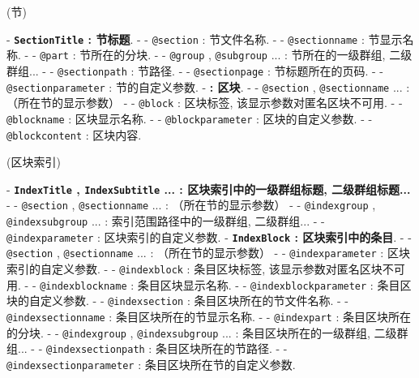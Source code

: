(\large 节){
    \par\medskip{}
    - \textbf{\texttt{SectionTitle} : 节标题}.
        - - \texttt{@section} : 节文件名称.
        - - \texttt{@sectionname} : 节显示名称.
        - - \texttt{@part} : 节所在的分块.
        - - \texttt{@group} , \texttt{@subgroup} ... : 节所在的一级群组, 二级群组...
        - - \texttt{@sectionpath} : 节路径.
        - - \texttt{@sectionpage} : 节标题所在的页码.
        - - \texttt{@sectionparameter} : 节的自定义参数.
    - \textbf{ : 区块}.
        - - \texttt{@section} , \texttt{@sectionname} ... : （所在节的显示参数）
        - - \texttt{@block} : 区块标签, 该显示参数对匿名区块不可用.
        - - \texttt{@blockname} : 区块显示名称.
        - - \texttt{@blockparameter} : 区块的自定义参数.
        - - \texttt{@blockcontent} : 区块内容.
}

\newpage

(\large 区块索引){
    \par\medskip{}
    - \textbf{\texttt{IndexTitle} , \texttt{IndexSubtitle} ... : 区块索引中的一级群组标题, 二级群组标题...}
        - - \texttt{@section} , \texttt{@sectionname} ... : （所在节的显示参数）
        - - \texttt{@indexgroup} , \texttt{@indexsubgroup} ... : 索引范围路径中的一级群组, 二级群组...
        - - \texttt{@indexparameter} : 区块索引的自定义参数.
    - \textbf{\texttt{IndexBlock} : 区块索引中的条目}.
        - - \texttt{@section} , \texttt{@sectionname} ... : （所在节的显示参数）
        - - \texttt{@indexparameter} : 区块索引的自定义参数.
        - - \texttt{@indexblock} : 条目区块标签, 该显示参数对匿名区块不可用.
        - - \texttt{@indexblockname} : 条目区块显示名称.
        - - \texttt{@indexblockparameter} : 条目区块的自定义参数.
        - - \texttt{@indexsection} : 条目区块所在的节文件名称.
        - - \texttt{@indexsectionname} : 条目区块所在的节显示名称.
        - - \texttt{@indexpart} : 条目区块所在的分块.
        - - \texttt{@indexgroup} , \texttt{@indexsubgroup} ... : 条目区块所在的一级群组, 二级群组...
        - - \texttt{@indexsectionpath} : 条目区块所在的节路径.
        - - \texttt{@indexsectionparameter} : 条目区块所在节的自定义参数.
}

